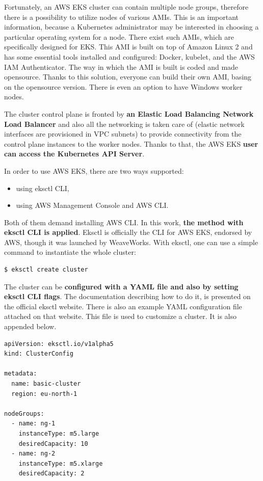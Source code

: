 Fortunately, an AWS EKS cluster can contain multiple node groups, therefore there is a possibility to utilize nodes of various AMIs\cite{eks-worker}. This is an important information, because a Kubernetes administrator may be interested in choosing a particular operating system for a node. There exist such AMIs, which are specifically designed for EKS. This AMI is built on top of Amazon Linux 2 and has some essential tools installed and configured: Docker, kubelet, and the AWS IAM Authenticator. The way in which the AMI is built is coded and made opensource. Thanks to this solution, everyone can build their own AMI, basing on the opensource version\cite{eks-optimized-ami}. There is even an option to have Windows worker nodes\cite{eks-worker-win}.

The cluster control plane is fronted by \textbf{an Elastic Load Balancing Network Load Balancer} and also all the networking is taken care of (elastic network interfaces are provisioned in VPC subnets) to provide connectivity from the control plane instances to the worker nodes. Thanks to that, the AWS EKS \textbf{user can access the Kubernetes API Server}\cite{eks-clusters}.

In order to use AWS EKS, there are two ways supported:
\begin{itemize}
\item using eksctl CLI,
\item using AWS Management Console and AWS CLI.
\end{itemize}

Both of them demand installing AWS CLI. In this work, \textbf{the method with eksctl CLI is applied}. Eksctl is officially the CLI for AWS EKS, endorsed by AWS, though it was launched by WeaveWorks. With eksctl, one can use a simple command to instantiate the whole cluster\cite{eks-cli-official}:
\begin{lstlisting}[basicstyle=\small,caption={A command of eksctl CLI tool used to create a Kubernetes cluster},captionpos=b,language=Bash,xleftmargin=1cm]
$ eksctl create cluster
\end{lstlisting}

The cluster can be \textbf{configured with a YAML file and also by setting eksctl CLI flags}. The documentation describing how to do it, is presented on the official eksctl website\cite{eksctl}. There is also an example YAML configuration file attached on that website. This file is used to customize a cluster. It is also appended below.

\begin{lstlisting}[basicstyle=\tiny,caption={An example YAML file used to customize a Kubernetes cluster created with eksctl CLI tool\cite{eksctl}},captionpos=b,language=Bash,xleftmargin=1cm]
apiVersion: eksctl.io/v1alpha5
kind: ClusterConfig

metadata:
  name: basic-cluster
  region: eu-north-1

nodeGroups:
  - name: ng-1
    instanceType: m5.large
    desiredCapacity: 10
  - name: ng-2
    instanceType: m5.xlarge
    desiredCapacity: 2
\end{lstlisting}

